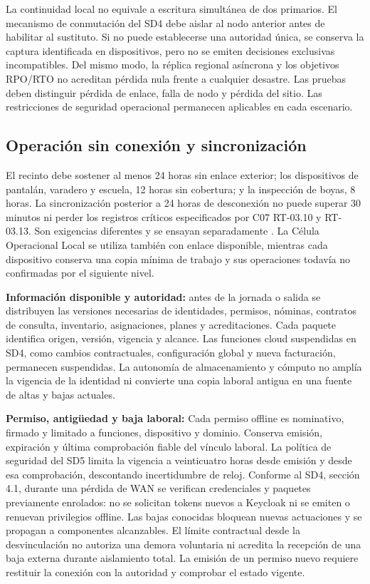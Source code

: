 La continuidad local no equivale a escritura simultánea de dos primarios. El mecanismo de conmutación del SD4 debe aislar al nodo anterior antes de habilitar al sustituto. Si no puede establecerse una autoridad única, se conserva la captura identificada en dispositivos, pero no se emiten decisiones exclusivas incompatibles. Del mismo modo, la réplica regional asíncrona y los objetivos RPO/RTO no acreditan pérdida nula frente a cualquier desastre. Las pruebas deben distinguir pérdida de enlace, falla de nodo y pérdida del sitio. Las restricciones de seguridad operacional permanecen aplicables en cada escenario.

\subsection{Operación sin conexión y sincronización}
\label{subsec:sd5_sincronizacion}

El recinto debe sostener al menos 24 horas sin enlace exterior; los dispositivos de pantalán, varadero y escuela, 12 horas sin cobertura; y la inspección de boyas, 8 horas. La sincronización posterior a 24 horas de desconexión no puede superar 30 minutos ni perder los registros críticos especificados por C07 RT-03.10 y RT-03.13. Son exigencias diferentes y se ensayan separadamente \parencite[cap.~15, RT-03.10/13]{caso07}. La Célula Operacional Local se utiliza también con enlace disponible, mientras cada dispositivo conserva una copia mínima de trabajo y sus operaciones todavía no confirmadas por el siguiente nivel.

\textbf{Información disponible y autoridad:} antes de la jornada o salida se distribuyen las versiones necesarias de identidades, permisos, nóminas, contratos de consulta, inventario, asignaciones, planes y acreditaciones. Cada paquete identifica origen, versión, vigencia y alcance. Las funciones cloud suspendidas en SD4, como cambios contractuales, configuración global y nueva facturación, permanecen suspendidas. La autonomía de almacenamiento y cómputo no amplía la vigencia de la identidad ni convierte una copia laboral antigua en una fuente de altas y bajas actuales.

\textbf{Permiso, antigüedad y baja laboral:} Cada permiso offline es nominativo, firmado y limitado a funciones, dispositivo y dominio. Conserva emisión, expiración y última comprobación fiable del vínculo laboral. La política de seguridad del SD5 limita la vigencia a veinticuatro horas desde emisión y desde esa comprobación, descontando incertidumbre de reloj. Conforme al SD4, sección 4.1, durante una pérdida de WAN se verifican credenciales y paquetes previamente enrolados: no se solicitan tokens nuevos a Keycloak ni se emiten o renuevan privilegios offline. Las bajas conocidas bloquean nuevas actuaciones y se propagan a componentes alcanzables. El límite contractual desde la desvinculación no autoriza una demora voluntaria ni acredita la recepción de una baja externa durante aislamiento total. La emisión de un permiso nuevo requiere restituir la conexión con la autoridad y comprobar el estado vigente.

